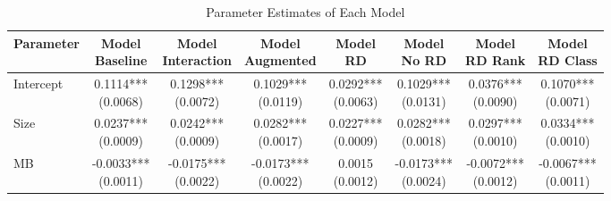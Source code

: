\documentclass{article}
\begin{document}
\begin{table}[h!]
    \centering
    \caption{Parameter Estimates of Each Model}
    \label{table:2}
    \begin{tabular}{lccccccc}
        \toprule
        Parameter  & \makecell{Model                                                                                                               \\ Baseline} & \makecell{Model \\ Interaction} & \makecell{Model \\ Augmented} & \makecell{Model \\ RD} & \makecell{Model \\ No RD} & \makecell{Model \\ RD Rank} & \makecell{Model \\ RD Class} \\
        \midrule
        Intercept  & \makecell{0.1114***                                                                                                           \\ (0.0068)} & \makecell{0.1298*** \\ (0.0072)} & \makecell{0.1029*** \\ (0.0119)} & \makecell{0.0292*** \\ (0.0063)} & \makecell{0.1029*** \\ (0.0131)} & \makecell{0.0376*** \\ (0.0090)} & \makecell{0.1070*** \\ (0.0071)} \\
        Size       & \makecell{0.0237***                                                                                                           \\ (0.0009)} & \makecell{0.0242*** \\ (0.0009)} & \makecell{0.0282*** \\ (0.0017)} & \makecell{0.0227*** \\ (0.0009)} & \makecell{0.0282*** \\ (0.0018)} & \makecell{0.0297*** \\ (0.0010)} & \makecell{0.0334*** \\ (0.0010)} \\
        MB         & \makecell{-0.0033***                                                                                                          \\ (0.0011)} & \makecell{-0.0175*** \\ (0.0022)} & \makecell{-0.0173*** \\ (0.0022)} & \makecell{0.0015 \\ (0.0012)} & \makecell{-0.0173*** \\ (0.0024)} & \makecell{-0.0072*** \\ (0.0012)} & \makecell{-0.0067*** \\ (0.0011)} \\

\end{tabular}
\end{table}
\end{document}
